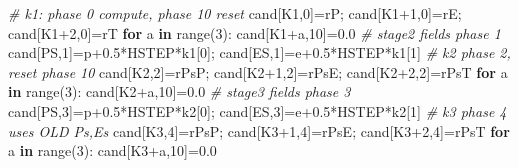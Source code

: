 \documentclass[
  a4paper,
]{ltjsarticle}
\newenvironment{Shaded}{}{}
\newcommand{\BuiltInTok}[1]{\textcolor[rgb]{0.00,0.50,0.00}{#1}}
\newcommand{\CommentTok}[1]{\textcolor[rgb]{0.38,0.63,0.69}{\textit{#1}}}
\newcommand{\ControlFlowTok}[1]{\textcolor[rgb]{0.00,0.44,0.13}{\textbf{#1}}}
\newcommand{\DecValTok}[1]{\textcolor[rgb]{0.25,0.63,0.44}{#1}}
\newcommand{\FloatTok}[1]{\textcolor[rgb]{0.25,0.63,0.44}{#1}}
\newcommand{\KeywordTok}[1]{\textcolor[rgb]{0.00,0.44,0.13}{\textbf{#1}}}
\newcommand{\NormalTok}[1]{#1}
\newcommand{\OperatorTok}[1]{\textcolor[rgb]{0.40,0.40,0.40}{#1}}
\begin{document}
\begin{Shaded}
\begin{Highlighting}[]
    \CommentTok{\# k1: phase 0 compute, phase 10 reset}
\NormalTok{    cand[K1,}\DecValTok{0}\NormalTok{]}\OperatorTok{=}\NormalTok{rP}\OperatorTok{;}\NormalTok{ cand[K1}\OperatorTok{+}\DecValTok{1}\NormalTok{,}\DecValTok{0}\NormalTok{]}\OperatorTok{=}\NormalTok{rE}\OperatorTok{;}\NormalTok{ cand[K1}\OperatorTok{+}\DecValTok{2}\NormalTok{,}\DecValTok{0}\NormalTok{]}\OperatorTok{=}\NormalTok{rT}
    \ControlFlowTok{for}\NormalTok{ a }\KeywordTok{in} \BuiltInTok{range}\NormalTok{(}\DecValTok{3}\NormalTok{): cand[K1}\OperatorTok{+}\NormalTok{a,}\DecValTok{10}\NormalTok{]}\OperatorTok{=}\FloatTok{0.0}
    \CommentTok{\# stage2 fields phase 1}
\NormalTok{    cand[PS,}\DecValTok{1}\NormalTok{]}\OperatorTok{=}\NormalTok{p}\OperatorTok{+}\FloatTok{0.5}\OperatorTok{*}\NormalTok{HSTEP}\OperatorTok{*}\NormalTok{k1[}\DecValTok{0}\NormalTok{]}\OperatorTok{;}\NormalTok{ cand[ES,}\DecValTok{1}\NormalTok{]}\OperatorTok{=}\NormalTok{e}\OperatorTok{+}\FloatTok{0.5}\OperatorTok{*}\NormalTok{HSTEP}\OperatorTok{*}\NormalTok{k1[}\DecValTok{1}\NormalTok{]}
    \CommentTok{\# k2 phase 2, reset phase 10}
\NormalTok{    cand[K2,}\DecValTok{2}\NormalTok{]}\OperatorTok{=}\NormalTok{rPsP}\OperatorTok{;}\NormalTok{ cand[K2}\OperatorTok{+}\DecValTok{1}\NormalTok{,}\DecValTok{2}\NormalTok{]}\OperatorTok{=}\NormalTok{rPsE}\OperatorTok{;}\NormalTok{ cand[K2}\OperatorTok{+}\DecValTok{2}\NormalTok{,}\DecValTok{2}\NormalTok{]}\OperatorTok{=}\NormalTok{rPsT}
    \ControlFlowTok{for}\NormalTok{ a }\KeywordTok{in} \BuiltInTok{range}\NormalTok{(}\DecValTok{3}\NormalTok{): cand[K2}\OperatorTok{+}\NormalTok{a,}\DecValTok{10}\NormalTok{]}\OperatorTok{=}\FloatTok{0.0}
    \CommentTok{\# stage3 fields phase 3}
\NormalTok{    cand[PS,}\DecValTok{3}\NormalTok{]}\OperatorTok{=}\NormalTok{p}\OperatorTok{+}\FloatTok{0.5}\OperatorTok{*}\NormalTok{HSTEP}\OperatorTok{*}\NormalTok{k2[}\DecValTok{0}\NormalTok{]}\OperatorTok{;}\NormalTok{ cand[ES,}\DecValTok{3}\NormalTok{]}\OperatorTok{=}\NormalTok{e}\OperatorTok{+}\FloatTok{0.5}\OperatorTok{*}\NormalTok{HSTEP}\OperatorTok{*}\NormalTok{k2[}\DecValTok{1}\NormalTok{]}
    \CommentTok{\# k3 phase 4 uses OLD Ps,Es}
\NormalTok{    cand[K3,}\DecValTok{4}\NormalTok{]}\OperatorTok{=}\NormalTok{rPsP}\OperatorTok{;}\NormalTok{ cand[K3}\OperatorTok{+}\DecValTok{1}\NormalTok{,}\DecValTok{4}\NormalTok{]}\OperatorTok{=}\NormalTok{rPsE}\OperatorTok{;}\NormalTok{ cand[K3}\OperatorTok{+}\DecValTok{2}\NormalTok{,}\DecValTok{4}\NormalTok{]}\OperatorTok{=}\NormalTok{rPsT}
    \ControlFlowTok{for}\NormalTok{ a }\KeywordTok{in} \BuiltInTok{range}\NormalTok{(}\DecValTok{3}\NormalTok{): cand[K3}\OperatorTok{+}\NormalTok{a,}\DecValTok{10}\NormalTok{]}\OperatorTok{=}\FloatTok{0.0}

\end{Highlighting}
\end{Shaded}
\end{document}
